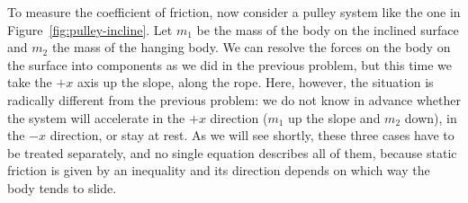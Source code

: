 \documentclass[11pt,a4paper]{article}
\begin{document}
To measure the coefficient of friction, now consider a pulley system like the one in
Figure~\ref{fig:pulley-incline}. Let $m_1$ be the mass of the body on the inclined surface and $m_2$ the
mass of the hanging body. We can resolve the forces on the body on the surface into components as we
did in the previous problem, but this time we take the $+x$ axis up the slope, along the rope. Here,
however, the situation is radically different from the previous problem: we do not know in advance
whether the system will accelerate in the $+x$ direction ($m_1$ up the slope and $m_2$ down), in the
$-x$ direction, or stay at rest. As we will see shortly, these
three cases have to be treated separately, and no single equation describes all of them, because
static friction is given by an inequality and its direction depends on which way the body tends to
slide.
\end{document}
